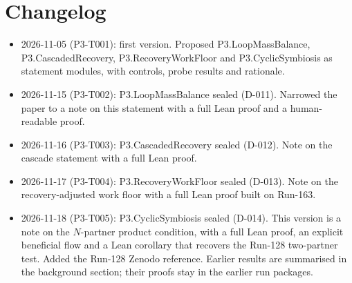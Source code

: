 \documentclass[11pt]{article}
\theoremstyle{definition}
\theoremstyle{remark}
\begin{document}
\section{Changelog}
\begin{itemize}
\item 2026-11-05 (P3-T001): first version. Proposed P3.LoopMassBalance, P3.CascadedRecovery,
P3.RecoveryWorkFloor and P3.CyclicSymbiosis as statement modules, with controls, probe results
and rationale.
\item 2026-11-15 (P3-T002): P3.LoopMassBalance sealed (D-011). Narrowed the paper to a note on
this statement with a full Lean proof and a human-readable proof.
\item 2026-11-16 (P3-T003): P3.CascadedRecovery sealed (D-012). Note on the cascade statement with
a full Lean proof.
\item 2026-11-17 (P3-T004): P3.RecoveryWorkFloor sealed (D-013). Note on the recovery-adjusted
work floor with a full Lean proof built on Run-163.
\item 2026-11-18 (P3-T005): P3.CyclicSymbiosis sealed (D-014). This version is a note on the
$N$-partner product condition, with a full Lean proof, an explicit beneficial flow and a Lean
corollary that recovers the Run-128 two-partner test. Added the Run-128 Zenodo reference. Earlier
results are summarised in the background section; their proofs stay in the earlier run packages.
\end{itemize}



\end{document}

